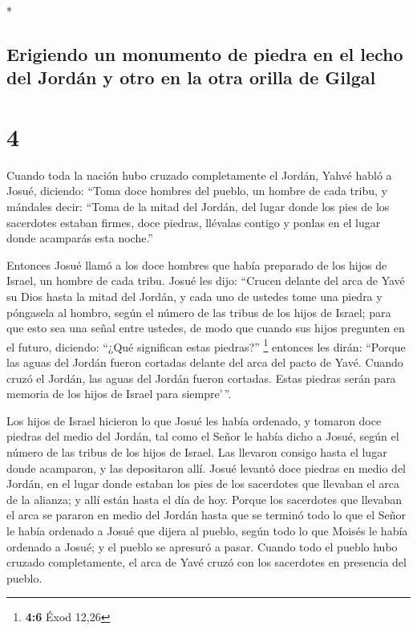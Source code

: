 \begin{paracol}{2}
\begin{otherlanguage}{english}
\end{otherlanguage}

\switchcolumn[0]*

\hypertarget{erigiendo-un-monumento-de-piedra-en-el-lecho-del-jorduxe1n-y-otro-en-la-otra-orilla-de-gilgal}{%
\subsection{Erigiendo un monumento de piedra en el lecho del Jordán y
otro en la otra orilla de
Gilgal}\label{erigiendo-un-monumento-de-piedra-en-el-lecho-del-jorduxe1n-y-otro-en-la-otra-orilla-de-gilgal}}

\hypertarget{section-6}{%
\section{4}\label{section-6}}

 Cuando toda la nación hubo cruzado completamente el
Jordán, Yahvé habló a Josué, diciendo:  ``Toma doce
hombres del pueblo, un hombre de cada tribu,  y mándales
decir: ``Toma de la mitad del Jordán, del lugar donde los pies de los
sacerdotes estaban firmes, doce piedras, llévalas contigo y ponlas en el
lugar donde acamparás esta noche.''

 Entonces Josué llamó a los doce hombres que había
preparado de los hijos de Israel, un hombre de cada tribu.
 Josué les dijo: ``Crucen delante del arca de Yavé su Dios
hasta la mitad del Jordán, y cada uno de ustedes tome una piedra y
póngasela al hombro, según el número de las tribus de los hijos de
Israel;  para que esto sea una señal entre ustedes, de
modo que cuando sus hijos pregunten en el futuro, diciendo: ``¿Qué
significan estas piedras?'' \footnote{\textbf{4:6} Éxod 12,26}
 entonces les dirán: ``Porque las aguas del Jordán fueron
cortadas delante del arca del pacto de Yavé. Cuando cruzó el Jordán, las
aguas del Jordán fueron cortadas. Estas piedras serán para memoria de
los hijos de Israel para siempre'\,''.

 Los hijos de Israel hicieron lo que Josué les había
ordenado, y tomaron doce piedras del medio del Jordán, tal como el Señor
le había dicho a Josué, según el número de las tribus de los hijos de
Israel. Las llevaron consigo hasta el lugar donde acamparon, y las
depositaron allí.  Josué levantó doce piedras en medio del
Jordán, en el lugar donde estaban los pies de los sacerdotes que
llevaban el arca de la alianza; y allí están hasta el día de hoy.
 Porque los sacerdotes que llevaban el arca se pararon en
medio del Jordán hasta que se terminó todo lo que el Señor le había
ordenado a Josué que dijera al pueblo, según todo lo que Moisés le había
ordenado a Josué; y el pueblo se apresuró a pasar. 
Cuando todo el pueblo hubo cruzado completamente, el arca de Yavé cruzó
con los sacerdotes en presencia del pueblo.


\end{paracol}

